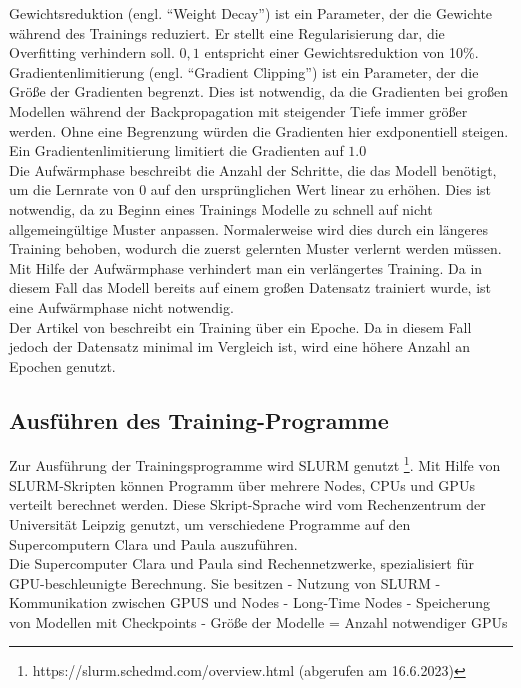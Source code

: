 Gewichtsreduktion (engl.
\enquote{Weight Decay}) ist ein Parameter, der die Gewichte während des Trainings reduziert.
Er stellt eine Regularisierung dar, die Overfitting verhindern soll.
$0,1$ entspricht einer Gewichtsreduktion von 10\%.\\

Gradientenlimitierung (engl.
\enquote{Gradient Clipping}) ist ein Parameter, der die Größe der Gradienten begrenzt.
Dies ist notwendig, da die Gradienten bei großen Modellen während der Backpropagation mit steigender Tiefe immer größer werden.
Ohne eine Begrenzung würden die Gradienten hier exdponentiell steigen.
Ein Gradientenlimitierung limitiert die Gradienten auf $1.0$\\

Die Aufwärmphase beschreibt die Anzahl der Schritte, die das Modell benötigt, um die Lernrate von $0$ auf den ursprünglichen Wert linear zu erhöhen.
Dies ist notwendig, da zu Beginn eines Trainings Modelle zu schnell auf nicht allgemeingültige Muster anpassen.
Normalerweise wird dies durch ein längeres Training behoben, wodurch die zuerst gelernten Muster verlernt werden müssen.
Mit Hilfe der Aufwärmphase verhindert man ein verlängertes Training.
Da in diesem Fall das Modell bereits auf einem großen Datensatz trainiert wurde, ist eine Aufwärmphase nicht notwendig.\\

Der Artikel von \citet{llama} beschreibt ein Training über ein Epoche. 
Da in diesem Fall jedoch der Datensatz minimal im Vergleich ist, wird eine höhere Anzahl an Epochen genutzt.\\

\subsection{Ausführen des Training-Programme}

Zur Ausführung der Trainingsprogramme wird SLURM genutzt \footnote{https://slurm.schedmd.com/overview.html (abgerufen am 16.6.2023)}. Mit Hilfe von SLURM-Skripten können Programm über mehrere Nodes, CPUs und GPUs verteilt berechnet werden. Diese Skript-Sprache wird vom Rechenzentrum der Universität Leipzig genutzt, um verschiedene Programme auf den Supercomputern Clara und Paula auszuführen.\\

Die Supercomputer Clara und Paula sind Rechennetzwerke, spezialisiert für GPU-beschleunigte Berechnung. Sie besitzen 
- Nutzung von SLURM
- Kommunikation zwischen GPUS und Nodes
- Long-Time Nodes
- Speicherung von Modellen mit Checkpoints
- Größe der Modelle = Anzahl notwendiger GPUs

